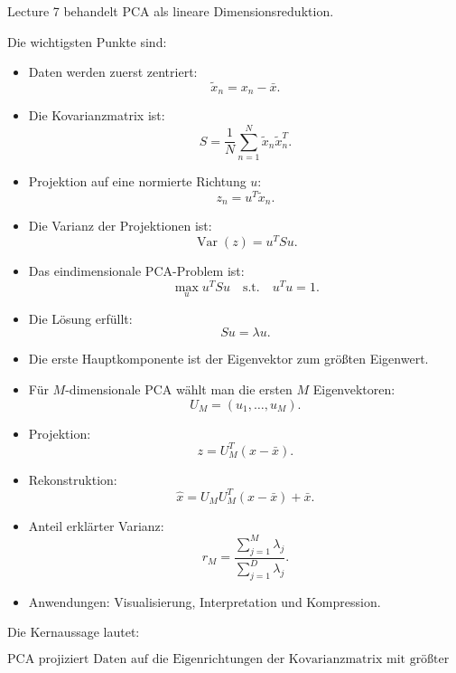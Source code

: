 \documentclass[11pt,a4paper]{scrartcl}
\begin{document}
\begin{answerbox}
    Lecture 7 behandelt PCA als lineare Dimensionsreduktion.

    Die wichtigsten Punkte sind:

    \begin{itemize}
        \item Daten werden zuerst zentriert:
        \[
            \tilde x_n = x_n-\bar x.
        \]

        \item Die Kovarianzmatrix ist:
        \[
            S
            =
            \frac{1}{N}
            \sum_{n=1}^{N}
            \tilde x_n\tilde x_n^T.
        \]

        \item Projektion auf eine normierte Richtung \(u\):
        \[
            z_n = u^T\tilde x_n.
        \]

        \item Die Varianz der Projektionen ist:
        \[
            \operatorname{Var}(z)
            =
            u^TSu.
        \]

        \item Das eindimensionale PCA-Problem ist:
        \[
            \max_u u^TSu
            \quad
            \text{s.t.}
            \quad
            u^Tu=1.
        \]

        \item Die Lösung erfüllt:
        \[
            Su=\lambda u.
        \]

        \item Die erste Hauptkomponente ist der Eigenvektor zum größten
        Eigenwert.

        \item Für \(M\)-dimensionale PCA wählt man die ersten \(M\)
        Eigenvektoren:
        \[
            U_M=(u_1,\dots,u_M).
        \]

        \item Projektion:
        \[
            z = U_M^T(x-\bar x).
        \]

        \item Rekonstruktion:
        \[
            \hat x
            =
            U_MU_M^T(x-\bar x)+\bar x.
        \]

        \item Anteil erklärter Varianz:
        \[
            r_M
            =
            \frac{\sum_{j=1}^{M}\lambda_j}
            {\sum_{j=1}^{D}\lambda_j}.
        \]

        \item Anwendungen:
        Visualisierung, Interpretation und Kompression.
    \end{itemize}

    Die Kernaussage lautet:

    \[
        \boxed{
            \text{PCA projiziert Daten auf die Eigenrichtungen der Kovarianzmatrix
            mit größter Varianz.}
        }
    \]
\end{answerbox}
\end{document}

